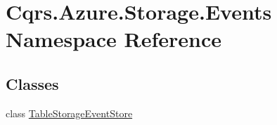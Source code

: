 \hypertarget{namespaceCqrs_1_1Azure_1_1Storage_1_1Events}{}\section{Cqrs.\+Azure.\+Storage.\+Events Namespace Reference}
\label{namespaceCqrs_1_1Azure_1_1Storage_1_1Events}
\subsection*{Classes}
\begin{DoxyCompactItemize}
\item 
class \hyperlink{classCqrs_1_1Azure_1_1Storage_1_1Events_1_1TableStorageEventStore}{Table\+Storage\+Event\+Store}
\end{DoxyCompactItemize}
